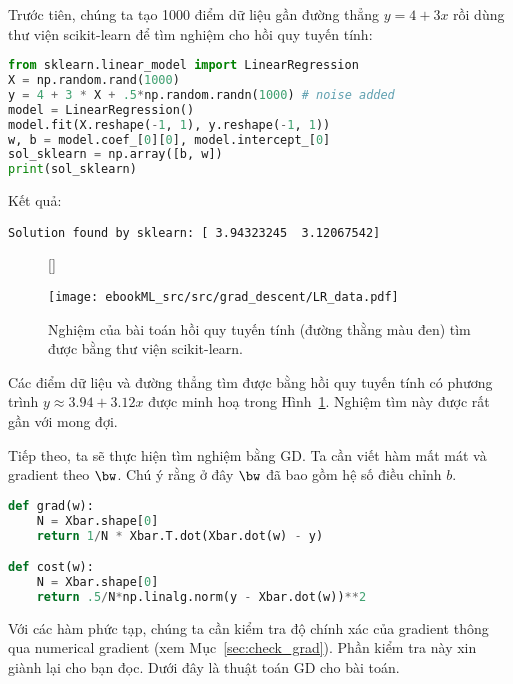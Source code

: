 Trước tiên, chúng ta tạo 1000 điểm dữ liệu gần đường thẳng $y = 4 + 3x$ rồi dùng thư viện scikit-learn để tìm nghiệm cho hồi quy tuyến tính:
  
\begin{lstlisting}[language=Python]
from sklearn.linear_model import LinearRegression 
X = np.random.rand(1000)
y = 4 + 3 * X + .5*np.random.randn(1000) # noise added
model = LinearRegression()
model.fit(X.reshape(-1, 1), y.reshape(-1, 1))
w, b = model.coef_[0][0], model.intercept_[0]
sol_sklearn = np.array([b, w])
print(sol_sklearn)
\end{lstlisting}
Kết quả:
\begin{lstlisting}
Solution found by sklearn: [ 3.94323245  3.12067542]
\end{lstlisting}
 
 
\begin{figure}[t]
     [\FBwidth]
     {\caption{ 
     Nghiệm của bài toán hồi quy tuyến tính (đường thằng màu đen) tìm được bằng
     thư viện scikit-learn.
     }
     \label{fig:7_lr_sklearn}}
     { %
    
     \texttt{[image: ebookML\_src/src/grad\_descent/LR\_data.pdf]}
     }
 \end{figure}
Các điểm dữ liệu và đường thẳng tìm được bằng hồi quy tuyến tính có phương trình
$y \approx 3.94 + 3.12x$ được minh hoạ trong Hình~\ref{fig:7_lr_sklearn}. Nghiệm
tìm này được rất gần với mong đợi.
 
Tiếp theo, ta sẽ thực hiện tìm nghiệm bằng GD. Ta cần viết hàm mất mát và gradient theo $\bw$. Chú ý rằng ở đây $\bw$ đã bao gồm hệ số điều chỉnh $b$.
 
\begin{lstlisting}[language=Python]
def grad(w):
    N = Xbar.shape[0]
    return 1/N * Xbar.T.dot(Xbar.dot(w) - y)

def cost(w):
    N = Xbar.shape[0]
    return .5/N*np.linalg.norm(y - Xbar.dot(w))**2
\end{lstlisting}

Với các hàm phức tạp, chúng ta cần kiểm tra độ chính xác của gradient thông
qua numerical gradient (xem Mục~\ref{sec:check_grad}). Phần kiểm tra này xin giành lại cho bạn đọc. Dưới đây là thuật toán GD cho bài toán.
 
